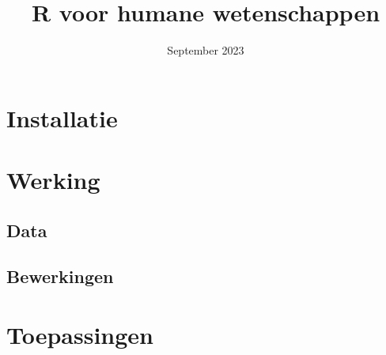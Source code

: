 \documentclass[a4paper,12pt, dutch, oneside ]{book}
\begin{document}
\title{R voor humane wetenschappen}
\date{September 2023}

\maketitle
\tableofcontents

\chapter{Installatie}

%

\chapter{Werking}

\section{Data}

\section{Bewerkingen}


\chapter{Toepassingen}
\end{document}
